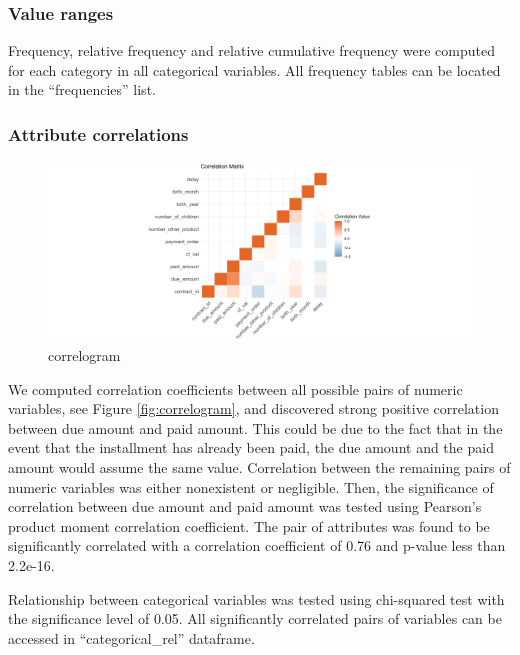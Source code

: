 \documentclass[
]{article}
\begin{document}
\hypertarget{value-ranges}{%
\subsubsection{Value ranges}\label{value-ranges}}

Frequency, relative frequency and relative cumulative frequency were computed for each category in all categorical variables. All frequency tables can be located in the ``frequencies'' list.

\hypertarget{attribute-correlations}{%
\subsubsection{Attribute correlations}\label{attribute-correlations}}

\begin{figure}
\centering
\includegraphics{Correlogram.svg}
\caption{correlogram}
\end{figure}

We computed correlation coefficients between all possible pairs of numeric variables, see Figure \ref{fig:correlogram}, and discovered strong positive correlation between due amount and paid amount. This could be due to the fact that in the event that the installment has already been paid, the due amount and the paid amount would assume the same value. Correlation between the remaining pairs of numeric variables was either nonexistent or negligible.
Then, the significance of correlation between due amount and paid amount was tested using Pearson's product moment correlation coefficient. The pair of attributes was found to be significantly correlated with a correlation coefficient of 0.76 and p-value less than 2.2e-16.

Relationship between categorical variables was tested using chi-squared test with the significance level of 0.05. All significantly correlated pairs of variables can be accessed in ``categorical\_rel'' dataframe.
\end{document}
